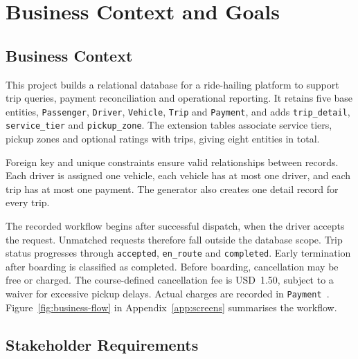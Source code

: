 \section{Business Context and Goals}
\label{sec:context}

\subsection{Business Context}
\label{subsec:background}

This project builds a relational database for a ride-hailing platform to support trip queries, payment reconciliation and operational reporting. It retains five base entities, \texttt{Passenger}, \texttt{Driver}, \texttt{Vehicle}, \texttt{Trip} and \texttt{Payment}, and adds \texttt{trip\_detail}, \texttt{service\_tier} and \texttt{pickup\_zone}. The extension tables associate service tiers, pickup zones and optional ratings with trips, giving eight entities in total.

Foreign key and unique constraints ensure valid relationships between records. Each driver is assigned one vehicle, each vehicle has at most one driver, and each trip has at most one payment. The generator also creates one detail record for every trip.

The recorded workflow begins after successful dispatch, when the driver accepts the request. Unmatched requests therefore fall outside the database scope. Trip status progresses through \texttt{accepted}, \texttt{en\_route} and \texttt{completed}. Early termination after boarding is classified as completed. Before boarding, cancellation may be free or charged. The course-defined cancellation fee is USD~1.50, subject to a waiver for excessive pickup delays. Actual charges are recorded in \texttt{Payment}~\cite{ubercancelfee,uberengmysql}. Figure~\ref{fig:business-flow} in Appendix~\ref{app:screens} summarises the workflow.

\subsection{Stakeholder Requirements}
\label{subsec:stakeholders}

